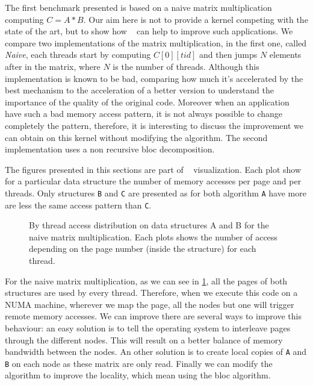 The first benchmark presented is based on a naive matrix multiplication
computing $C=A*B$. Our aim here is not to provide a kernel competing with the
state of the art, but to show how \TABARNAC~ can help to improve such
applications. We compare two implementations of the matrix multiplication, in
the first one, called \emph{Naive}, each threads start by computing
$C[0][tid]$ and then jumps $N$ elements after in the matrix, where $N$ is the
number of threads. Although this implementation is known to be bad, comparing
how much it's accelerated by the best mechanism to the acceleration of a
better version to understand the importance of the quality of the original
code. Moreover when an application have such a bad memory access pattern, it
is not always possible to change completely the pattern, therefore, it is
interesting to discuss the improvement we can obtain on this kernel without
modifying the algorithm. The second implementation uses a non recursive bloc
decomposition.

The figures presented in this sections are part of \TABARNAC~ visualization.
Each plot show for a particular data structure the number of memory accesses
per page and per threads. Only structures \texttt{B} and \texttt{C} are
presented as for both algorithm \texttt{A} have more are less the same access
pattern than \texttt{C}.

\begin{figure}[htb]
    \centering
    \caption{By thread access distribution on data structures A and B for the
        naive matrix multiplication. Each plots shows the number of access
    depending on the page number (inside the structure) for each thread.}
    \label{fig:matrix-naive}
\end{figure}

For the naive matrix multiplication, as we can see in
\ref{fig:matrix-naive}, all the pages of both structures are used by every
thread. Therefore, when we execute this code on a NUMA machine, wherever we
map the page, all the nodes but one will trigger remote memory accesses. We
can improve there are several ways to improve this behaviour: an easy solution
is to tell the operating system to interleave pages through the different
nodes. This will result on a better balance of memory bandwidth between the
nodes. An other solution is to create local copies of \texttt{A} and
\texttt{B} on each node as these matrix are only read. Finally we can modify
the algorithm to improve the locality, which mean using the bloc algorithm.

